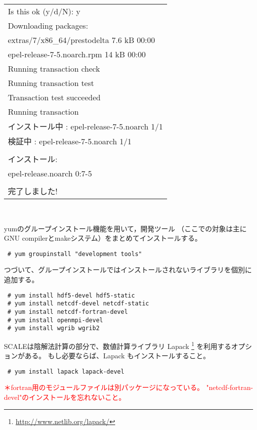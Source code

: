 {{{\begin{tabularx}{140mm}{l}
Is this ok (y/d/N): y\\
Downloading packages:\\
extras/7/x86\_64/prestodelta                                 7.6 kB   00:00\\
epel-release-7-5.noarch.rpm                                  14 kB   00:00\\
Running transaction check\\
Running transaction test\\
Transaction test succeeded\\
Running transaction\\
  インストール中          : epel-release-7-5.noarch                         1/1\\
  検証中                  : epel-release-7-5.noarch                         1/1\\
\\
インストール:\\
  epel-release.noarch 0:7-5\\
\\
完了しました!\\
\end{tabularx}
}}}\\


\noindent yumのグループインストール機能を用いて，開発ツール
（ここでの対象は主にGNU compilerとmakeシステム）をまとめてインストールする。
\begin{verbatim}
 # yum groupinstall "development tools"
\end{verbatim}

\noindent つづいて、グループインストールではインストールされないライブラリを個別に追加する。
\begin{verbatim}
 # yum install hdf5-devel hdf5-static
 # yum install netcdf-devel netcdf-static
 # yum install netcdf-fortran-devel
 # yum install openmpi-devel
 # yum install wgrib wgrib2
\end{verbatim}

SCALEは陰解法計算の部分で、数値計算ライブラリ Lapack
\footnote{\url{http://www.netlib.org/lapack/}}
を利用するオプションがある。
もし必要ならば、Lapack もインストールすること。
\begin{verbatim}
 # yum install lapack lapack-devel
\end{verbatim}

\noindent \textcolor{red}{\small ＊fortran用のモジュールファイルは別パッケージになっている。
"netcdf-fortran-devel"のインストールを忘れないこと。}

